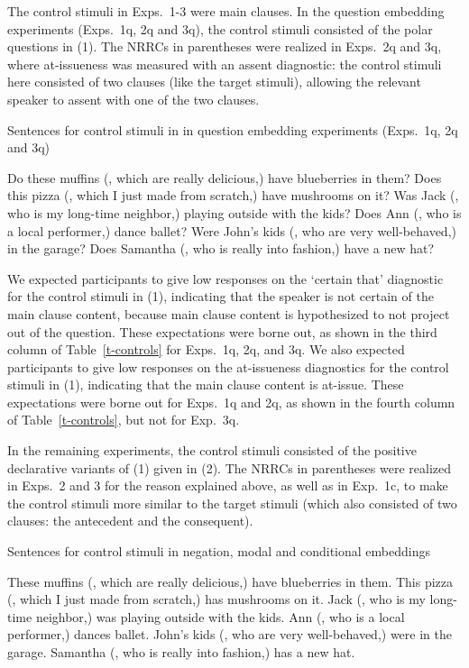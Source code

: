 \documentclass[11pt,fleqn]{article}
\newcommand{\6}{\mbox{$[\hspace*{-.6mm}[$}}
\newcommand{\9}{\mbox{$]\hspace*{-.6mm}]$}}
\begin{document}
The control stimuli in Exps.~1-3 were main clauses. In the question embedding experiments (Exps.~1q, 2q and 3q), the control stimuli consisted of the polar questions in (1). The NRRCs in parentheses were realized in Exps.~2q and 3q, where at-issueness was measured with an assent diagnostic: the control stimuli here consisted of two clauses (like the target stimuli), allowing the relevant speaker to assent with one of the two clauses.

\begin{exe}
 Sentences for control stimuli in in question embedding experiments (Exps.~1q, 2q and 3q)
\begin{xlist}
\ex Do these muffins (, which are really delicious,) have blueberries in them?
\ex Does this pizza (, which I just made from scratch,) have mushrooms on it? 
\ex Was Jack (, who is my long-time neighbor,) playing outside with the kids? 
\ex Does Ann (, who is a local performer,) dance ballet?
\ex Were John's kids (, who are very well-behaved,) in the garage?
\ex Does Samantha (, who is really into fashion,) have a new hat?
\end{xlist}
\end{exe}

We expected participants to give low responses on the `certain that' diagnostic for the control stimuli in (1), indicating that the speaker is not certain of the main clause content, because main clause content is hypothesized to not project out of the question. These expectations were borne out, as shown in the third column of Table~\ref{t-controls} for Exps.~1q, 2q, and 3q. We also expected participants to give low responses on the at-issueness diagnostics for the control stimuli in (1), indicating that the main clause content is at-issue. These expectations were borne out for Exps.~1q and 2q, as shown in the fourth column of Table~\ref{t-controls}, but not for Exp.~3q. 


In the remaining experiments, the control stimuli consisted of the positive declarative variants of (1) given in (2). The NRRCs in parentheses were realized in Exps.~2 and 3 for the reason explained above, as well as in Exp.~1c, to make the control stimuli more similar to the target stimuli (which also consisted of two clauses: the antecedent and the consequent).

\begin{exe}
  Sentences for control stimuli in negation, modal and conditional embeddings
\begin{xlist}
\ex These muffins (, which are really delicious,) have blueberries in them.
\ex This pizza (, which I just made from scratch,) has mushrooms on it. 
\ex Jack (, who is my long-time neighbor,) was playing outside with the kids. 
\ex Ann (, who is a local performer,) dances ballet.
\ex John's kids (, who are very well-behaved,) were in the garage.
\ex Samantha (, who is really into fashion,) has a new hat.
\end{xlist}
\end{exe}
\end{document}
